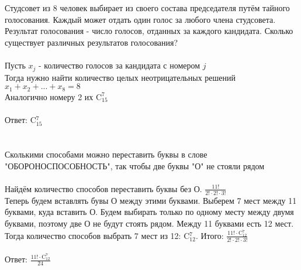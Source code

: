 \documentclass{article}
\begin{document}
\section{}
Студсовет из 8 человек выбирает из своего состава председателя путём тайного голосования. Каждый может отдать один голос за любого члена студсовета. Результат голосования - число голосов, отданных за каждого кандидата. Сколько существует различных результатов голосования?\\\\
Пусть $x_j$ - количество голосов за кандидата с номером $j$\\
Тогда нужно найти количество целых неотрицательных решений $x_1+x_2+...+x_8=8$\\
Аналогично номеру 2 их $\text{C}^7_{15}$
\\\\Ответ: C$^7_{15}$
\section{}
Сколькими способами можно переставить буквы в слове "ОБОРОНОСПОСОБНОСТЬ", так чтобы две буквы "О" не стояли рядом\\\\
Найдём количество способов переставить буквы без О. $\frac{11!}{2!\cdot2!\cdot 3!}$
\\Теперь будем вставлять бувы О между этими буквами. Выберем 7 мест между 11 буквами, куда вставить О. Будем выбирать только по одному месту между двумя буквами, поэтому две О не будут стоять рядом. Между 11 буквами есть 12 мест. Тогда количество способов выбрать 7 мест из 12: C$^{7}_{12}$. Итого: $\frac{11!\cdot\text{C}^{7}_{12}}{2!\cdot2!\cdot 3!}$
\\\\Ответ: $\frac{11!\cdot\text{C}^{7}_{12}}{24}$
\end{document}
